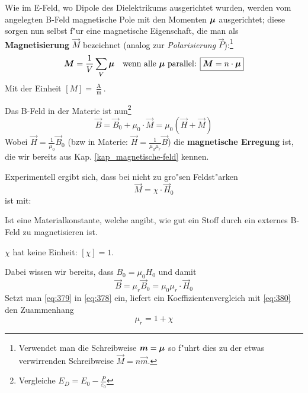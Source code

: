 Wie im E-Feld, wo Dipole des Dielektrikums ausgerichtet wurden, werden
vom angelegten B-Feld magnetische Pole mit den Momenten $\boldsymbol{\mu}$
ausgerichtet; diese sorgen nun selbst f"ur eine magnetische
Eigenschaft, die man als \textbf{Magnetisierung}
$\vec M$ bezeichnet (analog zur
\emph{Polarisierung} $\vec
P$):\footnote{Verwendet man die Schreibweise $\boldsymbol{m} = \boldsymbol{\mu}$ so
  f"uhrt dies zu der etwas verwirrenden Schreibweise $\vec M = n \vec m$.}
\begin{equation}
   \label{eqn_def_magnetisierung}
   \boldsymbol{M} = \frac{1}{V} \sum_V \boldsymbol{\mu} ~ ~ \text{ wenn alle $\boldsymbol{\mu}$
     parallel: } \boxed{\boldsymbol{M} = n \cdot \boldsymbol{\mu}}
\end{equation}
Mit der Einheit $[M] = \frac{\operatorname{A}}{\operatorname{m}}$.

Das B-Feld in der Materie ist nun\footnote{Vergleiche $E_D = E_0 - \frac{P}{\varepsilon_0}$}
\begin{equation}
   \label{eq:378}
   \vec B = \vec B_0 + \mu_0 \cdot \vec M = \mu_0 \left (\vec H + \vec
      M \right )
\end{equation}
Wobei $\vec H = \frac{1}{\mu_0} \vec B_0$ (bzw in Materie: $\vec H =
\frac{1}{\mu_0 \mu_r}\vec B$) die \textbf{magnetische Erregung} ist,
die wir bereits aus Kap. \ref{kap_magnetische-feld} kennen.

Experimentell ergibt sich, dass bei nicht zu gro"sen Feldst"arken
\begin{equation}
   \label{eq:379}
   \vec M = \chi \cdot \vec H_0
\end{equation}
ist mit:
\begin{Def}
    Ist eine Materialkonstante, welche angibt, wie gut ein
   Stoff durch ein externes B-Feld zu magnetisieren ist.
\end{Def}
$\chi$ hat keine Einheit: $[\chi] = 1$.

Dabei wissen wir bereits, dass $B_0 = \mu_0 H_0$ und damit
\begin{equation}
   \label{eq:380}
   \vec B = \mu_r \vec B_0 = \mu_0 \mu_r \cdot \vec H_0
\end{equation}
Setzt man \eqref{eq:379} in \eqref{eq:378} ein, liefert ein
Koeffizientenvergleich mit \eqref{eq:380} den Zuammenhang
\begin{equation}
   \label{eq:381}
   \mu_r = 1 + \chi
\end{equation}



